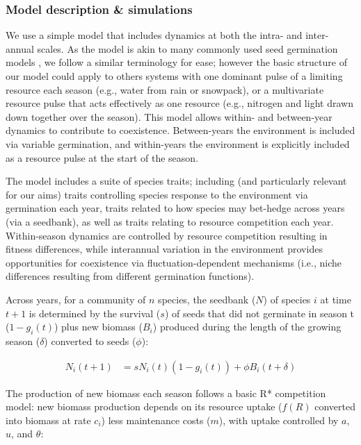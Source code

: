 \documentclass[11pt,letterpaper]{article}
\begin{document}
\subsubsection{Model description \& simulations}
We use a simple model that includes dynamics at both the intra- and inter-annual scales. As the model is akin to many commonly used seed germination models \citep{Chesson:2004eo}, we follow a similar terminology for ease; however the basic structure of our model could apply to others systems with one dominant pulse of a limiting resource each season (e.g., water from rain or snowpack), or a multivariate resource pulse that acts effectively as one resource (e.g., nitrogen and light drawn down together over the season).  This model allows within- and between-year dynamics to contribute to coexistence. Between-years the environment is included via variable germination, and within-years the environment is explicitly included as a resource pulse at the start of the season. 

The model includes a suite of species traits; including (and particularly relevant for our aims) traits controlling species response to the environment via germination each year, traits related to how species may bet-hedge across years (via a seedbank), as well as traits relating to resource competition each year. Within-season dynamics are controlled by resource competition resulting in fitness differences, while interannual variation in the environment provides opportunities for coexistence via fluctuation-dependent mechanisms (i.e., niche differences resulting from different germination functions). 

Across years, for a community of \(n\) species, the seedbank ($N$) of species $i$ at time $t+1$ is determined by the survival ($s$) of seeds that did not germinate in season t ($1-g_{i}(t)$) plus new biomass ($B_i$) produced during the length of the growing season ($\delta$) converted to seeds ($\phi$):
\begin{linenomath}
\begin{align}
N_{i}(t+1) & =
s N_{i}(t)(1-g_{i}(t))+\phi B_{i}(t+\delta)
\end{align}
\end{linenomath}
The production of new biomass each season follows a basic R* competition model: new biomass production depends on its resource uptake ($f(R)$ converted into biomass at rate $c_i$) less maintenance costs ($m$), with uptake controlled by $a$, $u$, and $\theta$:
\end{document}
